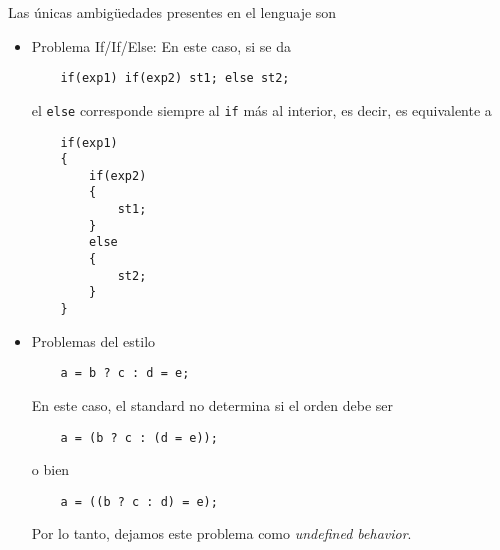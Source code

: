 \documentclass[12pt]{article}
\begin{document}
Las \'unicas ambig\"uedades presentes en el lenguaje son
\begin{itemize}
    \item Problema If/If/Else: En este caso, si se da
    \begin{verbatim}
    if(exp1) if(exp2) st1; else st2;
    \end{verbatim}
    el \texttt{else} corresponde siempre al \texttt{if} m\'as al interior, es decir, es equivalente a
    \begin{verbatim}
    if(exp1)
    {
        if(exp2)
        {
            st1;
        }
        else
        {
            st2;
        }
    }
    \end{verbatim}
    \item Problemas del estilo
    \begin{verbatim}
    a = b ? c : d = e;
    \end{verbatim}
    En este caso, el standard no determina si el orden debe ser
    \begin{verbatim}
    a = (b ? c : (d = e));
    \end{verbatim}
    o bien
    \begin{verbatim}
    a = ((b ? c : d) = e);
    \end{verbatim}
    Por lo tanto, dejamos este problema como \textit{undefined behavior}.
\end{itemize}
\end{document}
